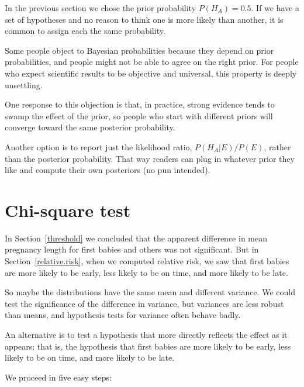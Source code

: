 \documentclass[12pt]{book}
\begin{document}
In the previous section we chose the prior probability $P(H_A) = 0.5$.
If we have a set of hypotheses and no reason to think one is more
likely than another, it is common to assign each the same probability.

Some people object to Bayesian probabilities because they depend on
prior probabilities, and people might not be able to agree on
the right prior.  For people who expect scientific results to be
objective and universal, this property is deeply unsettling.

One response to this objection is that, in practice, strong evidence
tends to swamp the effect of the prior, so people who start with
different priors will converge toward the same posterior
probability.

Another option is to report just the likelihood ratio, 
$P(H_A | E)/P(E)$, rather than the posterior probability.  That way
readers can plug in whatever prior they like and compute their own
posteriors (no pun intended).


\section{Chi-square test}

In Section~\ref{threshold} we concluded that the apparent difference
in mean pregnancy length for first babies and others was not
significant.  But in Section~\ref{relative.risk}, when we computed
relative risk, we saw that first babies are more likely to be early,
less likely to be on time, and more likely to be late.

So maybe the distributions have the same mean and different variance.
We could test the significance of the difference in variance, but
variances are less robust than means, and hypothesis tests for
variance often behave badly.

An alternative is to test a hypothesis that more directly reflects the
effect as it appears; that is, the hypothesis that first babies are
more likely to be early, less likely to be on time, and more likely to
be late.

We proceed in five easy steps:
\end{document}
